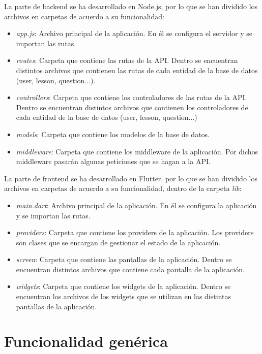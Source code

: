 La parte de backend se ha desarrollado en Node.js, por lo que se han dividido los archivos en carpetas de acuerdo a su funcionalidad:
\begin{itemize}
    \item \textit{app.js}: Archivo principal de la aplicación. En él se configura el servidor y se importan las rutas.
    \item \textit{routes}: Carpeta que contiene las rutas de la API. Dentro se encuentran distintos archivos que contienen las rutas de cada entidad de la base de datos (user, lesson, question...).
    \item \textit{controllers}: Carpeta que contiene los controladores de las rutas de la API. Dentro se encuentran distintos archivos que contienen los controladores de cada entidad de la base de datos (user, lesson, question...)
    \item \textit{models}: Carpeta que contiene los modelos de la base de datos.
    \item \textit{middleware}: Carpeta que contiene los middleware de la aplicación. Por dichos middleware pasarán algunas peticiones que se hagan a la API.
\end{itemize}

La parte de frontend se ha desarrollado en Flutter, por lo que se han dividido los archivos en carpetas de acuerdo a su funcionalidad, dentro de la carpeta \textit{lib}:

\begin{itemize}
  \item \textit{main.dart}: Archivo principal de la aplicación. En él se configura la aplicación y se importan las rutas.
  \item \textit{providers}: Carpeta que contiene los providers de la aplicación. Los providers son clases que se encargan de gestionar el estado de la aplicación.
  \item \textit{screen}: Carpeta que contiene las pantallas de la aplicación. Dentro se encuentran distintos archivos que contiene cada pantalla de la aplicación.
  \item \textit{widgets}: Carpeta que contiene los widgets de la aplicación. Dentro se encuentran los archivos de los widgets que se utilizan en las distintas pantallas de la aplicación.
\end{itemize}

\section{Funcionalidad genérica}

